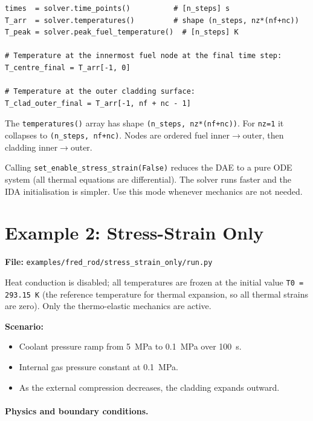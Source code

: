 \documentclass[11pt,a4paper]{article}
\begin{document}
\begin{lstlisting}
times  = solver.time_points()          # [n_steps] s
T_arr  = solver.temperatures()         # shape (n_steps, nz*(nf+nc))
T_peak = solver.peak_fuel_temperature()  # [n_steps] K

# Temperature at the innermost fuel node at the final time step:
T_centre_final = T_arr[-1, 0]

# Temperature at the outer cladding surface:
T_clad_outer_final = T_arr[-1, nf + nc - 1]
\end{lstlisting}

The \texttt{temperatures()} array has shape \texttt{(n\_steps, nz*(nf+nc))}.
For \texttt{nz=1} it collapses to \texttt{(n\_steps, nf+nc)}.  Nodes are
ordered fuel inner$\to$outer, then cladding inner$\to$outer.

Calling \texttt{set\_enable\_stress\_strain(False)} reduces the DAE to a
pure ODE system (all thermal equations are differential).  The solver runs
faster and the IDA initialisation is simpler.  Use this mode whenever
mechanics are not needed.


\section{Example 2: Stress-Strain Only}
\label{sec:sso}

\textbf{File:} \texttt{examples/fred\_rod/stress\_strain\_only/run.py}

\medskip
Heat conduction is disabled; all temperatures are frozen at the initial
value \texttt{T0 = 293.15 K} (the reference temperature for thermal expansion,
so all thermal strains are zero).  Only the thermo-elastic mechanics are
active.

\textbf{Scenario:}
\begin{itemize}
  \item Coolant pressure ramp from 5~MPa to 0.1~MPa over 100~s.
  \item Internal gas pressure constant at 0.1~MPa.
  \item As the external compression decreases, the cladding expands outward.
\end{itemize}

\paragraph{Physics and boundary conditions.}
\end{document}
